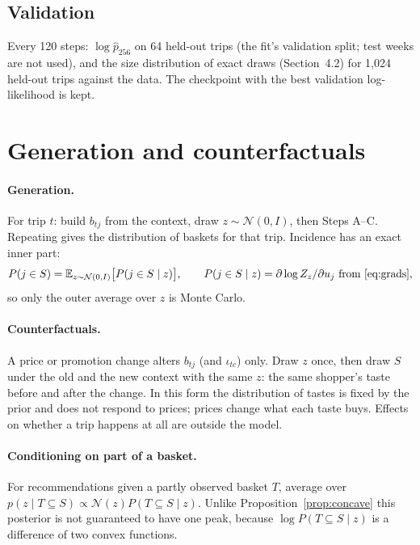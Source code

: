 \documentclass[11pt,a4paper]{article}
\theoremstyle{remark}
\newcommand{\N}{\mathcal N}
\newcommand{\E}{\mathbb E}
\begin{document}
\subsection{Validation}

Every 120 steps: $\log\hat p_{256}$ on 64 held-out trips (the fit's validation split; test weeks are not
used), and the size distribution of exact draws (Section~4.2) for 1{,}024 held-out trips against the data.
The checkpoint with the best validation log-likelihood is kept.

\section{Generation and counterfactuals}

\paragraph{Generation.} For trip $t$: build $b_{tj}$ from the context, draw $z\sim\N(0,I)$, then Steps A--C.
Repeating gives the distribution of baskets for that trip. Incidence has an exact inner part:
\[
P(j\in S)=\E_{z\sim\N(0,I)}\big[P(j\in S\mid z)\big],\qquad P(j\in S\mid z)=\partial\log Z_z/\partial u_j\ \text{from \eqref{eq:grads}},
\]
so only the outer average over $z$ is Monte Carlo.

\paragraph{Counterfactuals.} A price or promotion change alters $b_{tj}$ (and $\iota_{tc}$) only. Draw $z$ once,
then draw $S$ under the old and the new context with the same $z$: the same shopper's taste before and after
the change. In this form the distribution of tastes is fixed by the prior and does not respond to prices;
prices change what each taste buys. Effects on whether a trip happens at all are outside the model.

\paragraph{Conditioning on part of a basket.} For recommendations given a partly observed basket $T$,
average over $p(z\mid T\subseteq S)\propto\N(z)P(T\subseteq S\mid z)$. Unlike Proposition~\ref{prop:concave} this posterior is
not guaranteed to have one peak, because $\log P(T\subseteq S\mid z)$ is a difference of two convex functions.
\end{document}
